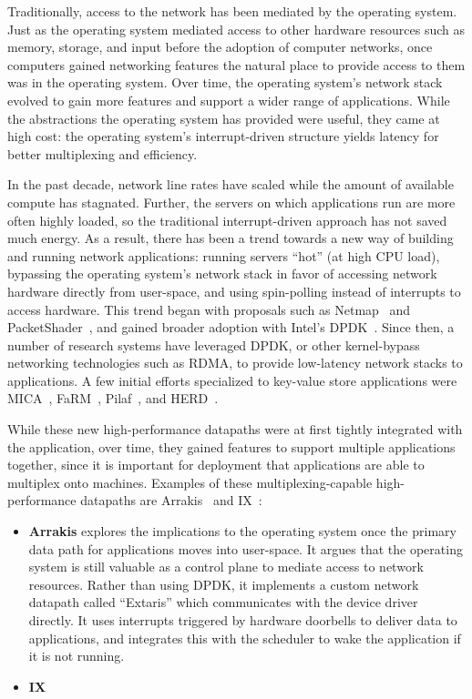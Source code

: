 Traditionally, access to the network has been mediated by the operating system. Just as the operating system mediated access to other hardware resources such as memory, storage, and input before the adoption of computer networks, once computers gained networking features the natural place to provide access to them was in the operating system.
Over time, the operating system's network stack evolved to gain more features and support a wider range of applications. While the abstractions the operating system has provided were useful, they came at high cost: the operating system's interrupt-driven structure yields latency for better multiplexing and efficiency.

In the past decade, network line rates have scaled while the amount of available compute has stagnated. Further, the servers on which applications run are more often highly loaded, so the traditional interrupt-driven approach has not saved much energy.
As a result, there has been a trend towards a new way of building and running network applications: running servers ``hot'' (\ie at high CPU load), bypassing the operating system's network stack in favor of accessing network hardware directly from user-space, and using spin-polling instead of interrupts to access hardware.
This trend began with proposals such as Netmap~\cite{netmap} and PacketShader~\cite{packetshader}, and gained broader adoption with Intel's DPDK~\cite{dpdk}.
Since then, a number of research systems have leveraged DPDK, or other kernel-bypass networking technologies such as RDMA, to provide low-latency network stacks to applications. A few initial efforts specialized to key-value store applications were MICA~\cite{mica}, FaRM~\cite{farm}, Pilaf~\cite{pilaf}, and HERD~\cite{herd}.

While these new high-performance datapaths were at first tightly integrated with the application, over time, they gained features to support multiple applications together, since it is important for deployment that applications are able to multiplex onto machines. Examples of these multiplexing-capable high-performance datapaths are Arrakis~\cite{arrakis} and IX~\cite{ix}:
\begin{itemize}
\item \textbf{Arrakis} explores the implications to the operating system once the primary data path for applications moves into user-space. It argues that the operating system is still valuable as a control plane to mediate access to network resources. Rather than using DPDK, it implements a custom network datapath called ``Extaris'' which communicates with the device driver directly. 
It uses interrupts triggered by hardware doorbells to deliver data to applications, and integrates this with the scheduler to wake the application if it is not running.
\item \textbf{IX} 
\end{itemize}

